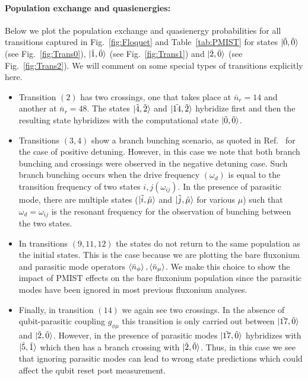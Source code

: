 \documentclass[%
reprint,
superscriptaddress,
 amsmath,amssymb,
 aps,
 prx,
longbibliography,
floatfix,
]{revtex4-2}
\begin{document}
\paragraph{Population exchange and quasienergies:}\label{app:Floquet-trans}
Below we plot the population exchange and quasienergy probabilities for all transitions captured in Fig.~\ref{fig:Floquet} and Table~\ref{tab:PMIST} for states $\ket{\tilde{0},\tilde{0}}$ (see Fig.~\ref{fig:Trans0}), $\ket{\tilde{1},\tilde{0}}$ (see Fig.~\ref{fig:Trans1}) and $\ket{\tilde{2},\tilde{0}}$ (see Fig.~\ref{fig:Trans2}). We will comment on some special types of transitions explicitly here.

\begin{itemize}
    \item Transition $(2)$ has two crossings, one that takes place at $\bar n_r=14$ and another at $\bar n_r=48$. The states $\ket{\tilde{4},\tilde{2}}$ and $\ket{\tilde{14},\tilde{2}}$ hybridize first and then the resulting state hybridizes with the computational state $\ket{\tilde{0},\tilde{0}}$.
    \item Transitions $(3,4)$ show a branch bunching scenario, as quoted in Ref.~\cite{dumas2024unified} for the case of positive detuning. However, in this case we note that both branch bunching and crossings were observed in the negative detuning case. Such branch bunching occurs when the drive frequency $(\omega_d)$ is equal to the transition frequency of two states $i,j (\omega_{ij})$. In the presence of parasitic mode, there are multiple states ($\ket{\tilde{i},\tilde{\mu
    }}$ and $\ket{\tilde{j},\tilde{\mu}}$ for various $\mu$) such that $\omega_d=\omega_{ij}$ is the resonant frequency for the observation of bunching between the two states.
    \item In transitions $(9,11,12)$ the states do not return to the same population as the initial states. This is the case because we are plotting the bare fluxonium and parasitic mode operators $\braket{\bar n_\phi},\braket{\bar n_\mu}$. We make this choice to show the impact of PMIST effects on the bare fluxonium population since the parasitic modes have been ignored in most previous fluxonium analyses.
    \item Finally, in transition $(14)$ we again see two crossings. In the absence of qubit-parasitic coupling $g_{\phi\mu}$ this transition is only carried out between  $\ket{\tilde{17},\tilde{0}}$ and $\ket{\tilde{2},\tilde{0}}$. However, in the presence of parasitic modes $\ket{\tilde{17},\tilde{0}}$ hybridizes with $\ket{\tilde{5},\tilde{1}}$ which then has a branch crossing with $\ket{\tilde{2},\tilde{0}}$. Thus, in this case we see that ignoring parasitic modes can lead to wrong state predictions which could affect the qubit reset post measurement.
\end{itemize}
\end{document}
